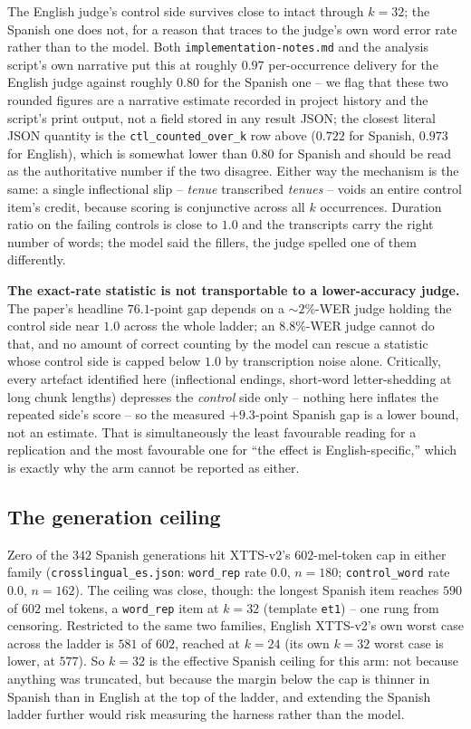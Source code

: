 \documentclass[11pt]{article}
\begin{document}
\noindent The English judge's control side survives close to intact through
$k{=}32$; the Spanish one does not, for a reason that traces to the judge's
own word error rate rather than to the model. Both \texttt{implementation-notes.md}
and the analysis script's own narrative put this at roughly $0.97$
per-occurrence delivery for the English judge against roughly $0.80$ for the
Spanish one -- we flag that these two rounded figures are a narrative estimate
recorded in project history and the script's print output, not a field stored
in any result JSON; the closest literal JSON quantity is the
\texttt{ctl\_counted\_over\_k} row above ($0.722$ for Spanish, $0.973$ for
English), which is somewhat lower than $0.80$ for Spanish and should be read
as the authoritative number if the two disagree. Either way the mechanism is
the same: a single inflectional slip -- \emph{tenue} transcribed
\emph{tenues} -- voids an entire control item's credit, because scoring is
conjunctive across all $k$ occurrences. Duration ratio on the failing controls
is close to $1.0$ and the transcripts carry the right number of words; the
model said the fillers, the judge spelled one of them differently.

\textbf{The exact-rate statistic is not transportable to a lower-accuracy
judge.} The paper's headline $76.1$-point gap depends on a
$\sim2\%$-WER judge holding the control side near $1.0$ across the whole
ladder; an $8.8\%$-WER judge cannot do that, and no amount of correct counting
by the model can rescue a statistic whose control side is capped below $1.0$
by transcription noise alone. Critically, every artefact identified here
(inflectional endings, short-word letter-shedding at long chunk lengths)
depresses the \emph{control} side only -- nothing here inflates the repeated
side's score -- so the measured $+9.3$-point Spanish gap is a lower bound, not
an estimate. That is simultaneously the least favourable reading for a
replication and the most favourable one for ``the effect is
English-specific,'' which is exactly why the arm cannot be reported as either.

\subsection{The generation ceiling}

Zero of the $342$ Spanish generations hit XTTS-v2's $602$-mel-token cap in
either family (\texttt{crosslingual\_es.json}: \texttt{word\_rep} rate
$0.0$, $n{=}180$; \texttt{control\_word} rate $0.0$, $n{=}162$). The ceiling
was close, though: the longest Spanish item reaches $590$ of $602$ mel
tokens, a \texttt{word\_rep} item at $k{=}32$ (template \texttt{et1}) -- one
rung from censoring. Restricted to the same two families, English XTTS-v2's
own worst case across the ladder is $581$ of $602$, reached at $k{=}24$ (its
own $k{=}32$ worst case is lower, at $577$). So $k{=}32$ is the effective
Spanish ceiling for this arm: not because anything was truncated, but because
the margin below the cap is thinner in Spanish than in English at the top of
the ladder, and extending the Spanish ladder further would risk measuring the
harness rather than the model.
\end{document}

